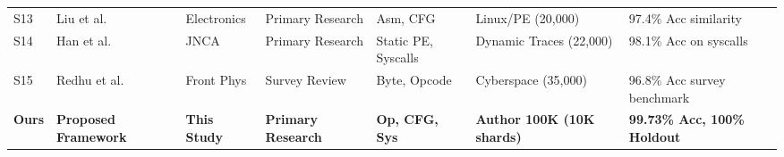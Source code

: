 \documentclass[pdflatex,sn-mathphys-num]{sn-jnl}
\begin{document}
\begin{tableorg}[t]
{\begin{tabular}{lllllll}
S13 & Liu et al. \cite{Codeformer2023} & Electronics & Primary Research & Asm, CFG & Linux/PE (20,000) & 97.4\% Acc similarity \\
S14 & Han et al. \cite{MalInsight2019} & JNCA & Primary Research & Static PE, Syscalls & Dynamic Traces (22,000) & 98.1\% Acc on syscalls \\
S15 & Redhu et al. \cite{Redhu2024} & Front Phys & Survey Review & Byte, Opcode & Cyberspace (35,000) & 96.8\% Acc survey benchmark \\
\midrule
\textbf{Ours} & \textbf{Proposed Framework} & \textbf{This Study} & \textbf{Primary Research} & \textbf{Op, CFG, Sys} & \textbf{Author 100K (10K shards)} & \textbf{99.73\% Acc, 100\% Holdout} \\
\bottomrule
\end{tabular}%
}
\end{tableorg}
\end{document}
